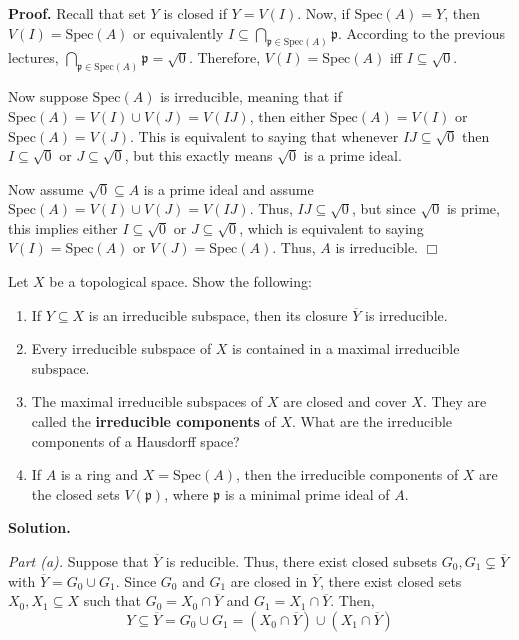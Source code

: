 \documentclass{template}
\newcommand{\qedwhite}{\hfill \ensuremath{\Box}}
\begin{document}
\textbf{Proof.} Recall that set $Y$ is closed if $Y=V(I)$. Now, if
$\text{Spec}(A) = Y$, then $V(I) = \text{Spec}(A)$ or equivalently $I \subseteq
\bigcap_{\mathfrak{p} \in \text{Spec}(A)}\mathfrak{p}$. According to the
previous lectures, $\bigcap_{\mathfrak{p} \in \text{Spec}(A)}\mathfrak{p} =
\sqrt{0}$. Therefore, $V(I)=\text{Spec}(A)$ iff $I \subseteq \sqrt{0}$.

Now suppose $\text{Spec}(A)$ is irreducible, meaning that if $\text{Spec}(A) =
V(I) \cup V(J) = V(IJ)$, then either $\text{Spec}(A) = V(I)$ or
$\text{Spec}(A)=V(J)$. This is equivalent to saying that whenever $IJ \subseteq
\sqrt{0}$ then $I \subseteq \sqrt{0}$ or $J \subseteq \sqrt{0}$, but this
exactly means $\sqrt{0}$ is a prime ideal.

Now assume $\sqrt{0} \subseteq A$ is a prime ideal and assume $\text{Spec}(A) =
V(I) \cup V(J) = V(IJ)$. Thus, $IJ \subseteq \sqrt{0}$, but since $\sqrt{0}$ is
prime, this implies either $I \subseteq \sqrt{0}$ or $J \subseteq \sqrt{0}$,
which is equivalent to saying $V(I)=\text{Spec}(A)$ or $V(J)=\text{Spec}(A)$.
Thus, $A$ is irreducible. \qedwhite

\begin{problem}[Exercise 4]
    Let $X$ be a topological space. Show the following:
    \begin{enumerate}
        \item[\textit{(a)}] If $Y \subseteq X$ is an irreducible subspace, then
        its closure $\overline{Y}$ is irreducible.
        \item[\textit{(b)}] Every irreducible subspace of $X$ is contained 
        in a maximal irreducible subspace.
        \item[\textit{(c)}] The maximal irreducible subspaces of $X$ are closed
        and cover $X$. They are called the \textbf{irreducible components} of
        $X$. What are the irreducible components of a Hausdorff space?
        \item[\textit{(d)}] If $A$ is a ring and $X=\text{Spec}(A)$, then the
        irreducible components of $X$ are the closed sets $V(\mathfrak{p})$,
        where $\mathfrak{p}$ is a minimal prime ideal of $A$.
    \end{enumerate}
\end{problem}

\textbf{Solution.}

\textit{Part (a).} Suppose that $\overline{Y}$ is reducible. Thus, there exist
closed subsets $G_0, G_1 \subsetneq \overline{Y}$ with $\overline{Y} = G_0 \cup
G_1$. Since $G_0$ and $G_1$ are closed in $\overline{Y}$, there exist closed
sets $X_0, X_1 \subseteq X$ such that $G_0 = X_0 \cap \overline{Y}$ and $G_1 =
X_1 \cap \overline{Y}$. Then, 
\begin{equation*}
    Y \subseteq \overline{Y} = G_0 \cup G_1 = (X_0 \cap \overline{Y}) \cup (X_1 \cap \overline{Y})
\end{equation*}
\end{document}
